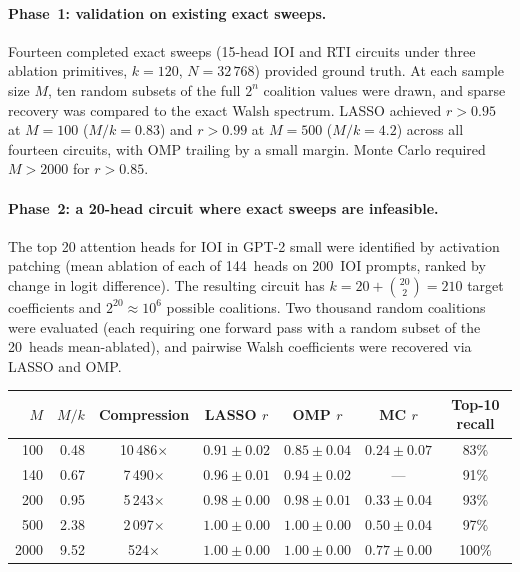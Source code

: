 \documentclass{article}
\begin{document}
\paragraph{Phase~1: validation on existing exact sweeps.}

Fourteen completed exact sweeps (15-head IOI and RTI circuits under three
ablation primitives, $k = 120$, $N = 32\,768$) provided ground truth. At
each sample size $M$, ten random subsets of the full $2^n$ coalition values
were drawn, and sparse recovery was compared to the exact Walsh spectrum.
LASSO achieved $r > 0.95$ at $M = 100$ ($M/k = 0.83$) and $r > 0.99$ at
$M = 500$ ($M/k = 4.2$) across all fourteen circuits, with OMP trailing by
a small margin. Monte Carlo required $M > 2000$ for $r > 0.85$.

\paragraph{Phase~2: a 20-head circuit where exact sweeps are infeasible.}

The top 20 attention heads for IOI in GPT-2 small were identified by
activation patching (mean ablation of each of 144~heads on 200~IOI prompts,
ranked by change in logit difference). The resulting circuit has
$k = 20 + \binom{20}{2} = 210$ target coefficients and $2^{20} \approx 10^6$
possible coalitions. Two thousand random coalitions were evaluated (each
requiring one forward pass with a random subset of the 20~heads mean-ablated),
and pairwise Walsh coefficients were recovered via LASSO and OMP.

\medskip

\begin{tabular}{rrccccc}
\toprule
$M$ & $M/k$ & Compression & LASSO $r$ & OMP $r$ & MC $r$ & Top-10 recall \\
\midrule
  100 & 0.48 &  10\,486$\times$ & $0.91 \pm 0.02$ & $0.85 \pm 0.04$ & $0.24 \pm 0.07$ & 83\% \\
  140 & 0.67 &   7\,490$\times$ & $0.96 \pm 0.01$ & $0.94 \pm 0.02$ & --- & 91\% \\
  200 & 0.95 &   5\,243$\times$ & $0.98 \pm 0.00$ & $0.98 \pm 0.01$ & $0.33 \pm 0.04$ & 93\% \\
  500 & 2.38 &   2\,097$\times$ & $1.00 \pm 0.00$ & $1.00 \pm 0.00$ & $0.50 \pm 0.04$ & 97\% \\
 2000 & 9.52 &     524$\times$ & $1.00 \pm 0.00$ & $1.00 \pm 0.00$ & $0.77 \pm 0.00$ & 100\% \\
\bottomrule
\end{tabular}
\end{document}
